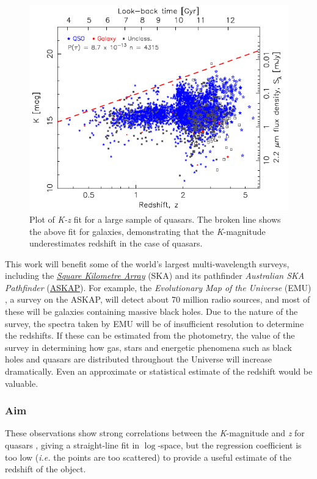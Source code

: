 \documentclass[11pt,a4paper]{report}
\begin{document}
	\begin{figure}[h!]
		\centering
		\includegraphics[scale=0.8]{quasars_fit.PNG}
		\caption[Fit for quasars]{{\small Plot of \textit{K-z} fit for a large sample of quasars. The broken line shows the above fit for galaxies, demonstrating that the \textit{K}-magnitude underestimates redshift in the case of quasars.}}
		\label{fig:quasar_fit}
	\end{figure}
	\newpage
		This work will benefit some of the world's largest multi-wavelength surveys,
	including the
	\href{https://en.wikipedia.org/wiki/Square_Kilometre_Array}{\textit{Square
			Kilometre Array}} (SKA) and its pathfinder \textit{Australian SKA Pathfinder} (\href{https://en.wikipedia.org/wiki/Australian_Square_Kilometre_Array_Pathfinder}{ASKAP}). For example, the \textit{Evolutionary Map of the
		Universe} (EMU) \cite{2011PASA...28..215N}, a survey on the ASKAP, will detect about 70 million radio
	sources, and most of these will be galaxies containing massive black holes. Due
	to the nature of the survey, the spectra taken by EMU will be of insufficient
	resolution to determine the redshifts. If these can be estimated from the
	photometry, the value of the survey in determining how gas, stars and energetic
	phenomena such as black holes and quasars are distributed throughout the
	Universe will increase dramatically. Even an approximate or statistical estimate of the redshift would be valuable.\\
	
	\subsubsection*{Aim}
	These observations show strong correlations between the
	\textit{K}-magnitude and \textit{z} for quasars \cite{2018MNRAS.476.3580C}
	, giving a straight-line fit in $\log$-space, but
	the regression coefficient is too low (\textit{i.e.} the points are too
	scattered) to provide a useful estimate of the redshift of the object.\\
	
\end{document}
